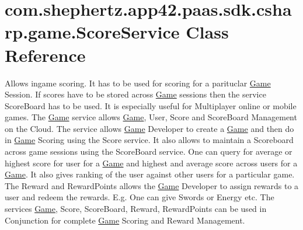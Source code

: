 \hypertarget{classcom_1_1shephertz_1_1app42_1_1paas_1_1sdk_1_1csharp_1_1game_1_1_score_service}{\section{com.\+shephertz.\+app42.\+paas.\+sdk.\+csharp.\+game.\+Score\+Service Class Reference}
\label{classcom_1_1shephertz_1_1app42_1_1paas_1_1sdk_1_1csharp_1_1game_1_1_score_service}
}


Allows ingame scoring. It has to be used for scoring for a parituclar \hyperlink{classcom_1_1shephertz_1_1app42_1_1paas_1_1sdk_1_1csharp_1_1game_1_1_game}{Game} Session. If scores have to be stored across \hyperlink{classcom_1_1shephertz_1_1app42_1_1paas_1_1sdk_1_1csharp_1_1game_1_1_game}{Game} sessions then the service Score\+Board has to be used. It is especially useful for Multiplayer online or mobile games. The \hyperlink{classcom_1_1shephertz_1_1app42_1_1paas_1_1sdk_1_1csharp_1_1game_1_1_game}{Game} service allows \hyperlink{classcom_1_1shephertz_1_1app42_1_1paas_1_1sdk_1_1csharp_1_1game_1_1_game}{Game}, User, Score and Score\+Board Management on the Cloud. The service allows \hyperlink{classcom_1_1shephertz_1_1app42_1_1paas_1_1sdk_1_1csharp_1_1game_1_1_game}{Game} Developer to create a \hyperlink{classcom_1_1shephertz_1_1app42_1_1paas_1_1sdk_1_1csharp_1_1game_1_1_game}{Game} and then do in \hyperlink{classcom_1_1shephertz_1_1app42_1_1paas_1_1sdk_1_1csharp_1_1game_1_1_game}{Game} Scoring using the Score service. It also allows to maintain a Scoreboard across game sessions using the Score\+Board service. One can query for average or highest score for user for a \hyperlink{classcom_1_1shephertz_1_1app42_1_1paas_1_1sdk_1_1csharp_1_1game_1_1_game}{Game} and highest and average score across users for a \hyperlink{classcom_1_1shephertz_1_1app42_1_1paas_1_1sdk_1_1csharp_1_1game_1_1_game}{Game}. It also gives ranking of the user against other users for a particular game. The Reward and Reward\+Points allows the \hyperlink{classcom_1_1shephertz_1_1app42_1_1paas_1_1sdk_1_1csharp_1_1game_1_1_game}{Game} Developer to assign rewards to a user and redeem the rewards. E.\+g. One can give Swords or Energy etc. The services \hyperlink{classcom_1_1shephertz_1_1app42_1_1paas_1_1sdk_1_1csharp_1_1game_1_1_game}{Game}, Score, Score\+Board, Reward, Reward\+Points can be used in Conjunction for complete \hyperlink{classcom_1_1shephertz_1_1app42_1_1paas_1_1sdk_1_1csharp_1_1game_1_1_game}{Game} Scoring and Reward Management.  


